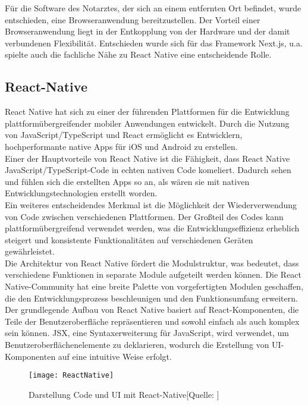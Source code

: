 Für die Software des Notarztes, der sich an einem entfernten Ort befindet, 
wurde entschieden, eine Browseranwendung bereitzustellen. Der Vorteil einer
Browseranwendung liegt in der Entkopplung von der Hardware und der damit
verbundenen Flexibilität. Entschieden wurde sich für das Framework Next.js, u.a.
spielte auch die fachliche Nähe zu React Native eine entscheidende Rolle.\\

\subsection{React-Native}
React Native hat sich zu einer der führenden Plattformen für die
Entwicklung plattformübergreifender mobiler Anwendungen entwickelt. 
Durch die Nutzung von JavaScript/TypeScript und React ermöglicht es 
Entwicklern, hochperformante native Apps für iOS und Android zu erstellen. \\

Einer der Hauptvorteile von React Native ist die Fähigkeit, dass 
React Native JavaScript/TypeScript-Code in echten nativen Code komeliert.
Dadurch sehen und fühlen sich die erstellten Apps so an, als wären sie 
mit nativen Entwicklungstechnologien erstellt worden.\\

Ein weiteres entscheidendes Merkmal ist die Möglichkeit der 
Wiederverwendung von Code zwischen verschiedenen Plattformen.
Der Großteil des Codes kann plattformübergreifend verwendet werden,
was die Entwicklungseffizienz erheblich steigert und konsistente 
Funktionalitäten auf verschiedenen Geräten gewährleistet.\\

Die Architektur von React Native fördert die Modulstruktur, 
was bedeutet, dass verschiedene Funktionen in separate Module aufgeteilt 
werden können. Die React Native-Community hat eine breite Palette 
von vorgefertigten Modulen geschaffen, die den Entwicklungsprozess 
beschleunigen und den Funktionsumfang erweitern.\\

Der grundlegende Aufbau von React Native basiert auf React-Komponenten,
die Teile der Benutzeroberfläche repräsentieren und sowohl einfach
als auch komplex sein können. 
JSX, eine Syntaxerweiterung für JavaScript, wird verwendet, um Benutzeroberflächenelemente 
zu deklarieren, wodurch die Erstellung von UI-Komponenten auf eine 
intuitive Weise erfolgt.\\

\begin{figure}[H]
    \centering
    \texttt{[image: ReactNative]}
    \caption{Darstellung Code und UI mit React-Native[Quelle: \cite{ReactNativeCode}]}
    \label{img:ReactNative}
\end{figure}

